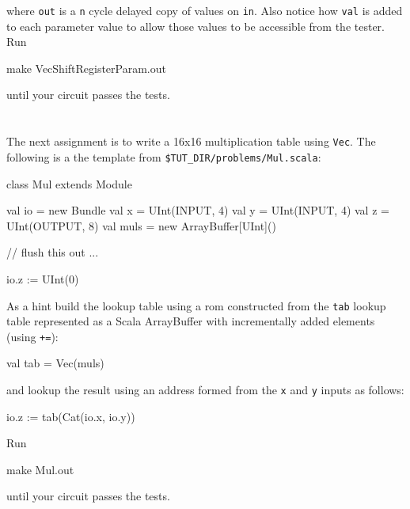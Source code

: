 \noindent
where \verb+out+ is a \verb+n+ cycle delayed copy of values on \verb+in+.  
Also notice how \verb+val+ is added to each parameter value to 
allow those values to be accessible from the tester. Run 

\begin{bash}
make VecShiftRegisterParam.out
\end{bash}

\noindent 
until your circuit passes the tests.

\section{}

The next assignment is to write a 16x16 multiplication table using \verb+Vec+.
The following is a the template from \verb+$TUT_DIR/problems/Mul.scala+:

\begin{scala}
class Mul extends Module {
  val io = new Bundle {
    val x   = UInt(INPUT,  4)
    val y   = UInt(INPUT,  4)
    val z   = UInt(OUTPUT, 8)
  }
  val muls = new ArrayBuffer[UInt]()

  // flush this out ...

  io.z := UInt(0)
}
\end{scala}

\noindent
As a hint build the lookup table using a rom constructed from the \verb+tab+ lookup table represented as a Scala ArrayBuffer with incrementally added elements (using \verb!+=!):

\begin{scala}
val tab = Vec(muls)
\end{scala}

\noindent
and lookup the result using an address formed from the \verb+x+ and \verb+y+ inputs as follows:

\begin{scala}
io.z := tab(Cat(io.x, io.y))
\end{scala}

\noindent
Run 

\begin{bash}
make Mul.out
\end{bash}

\noindent 
until your circuit passes the tests.

